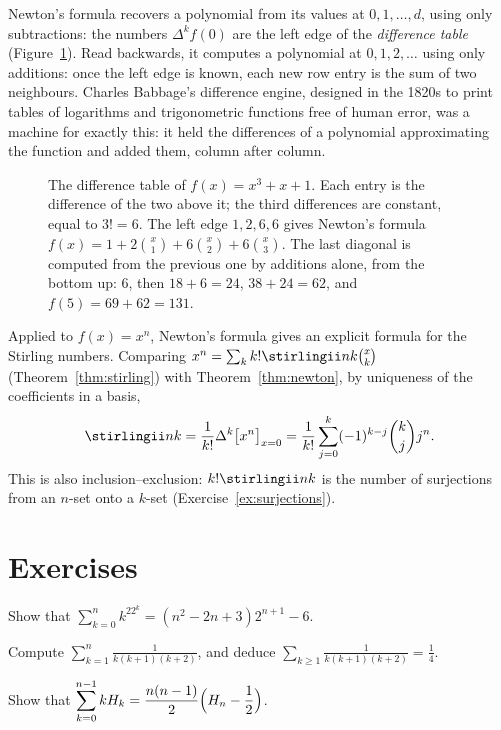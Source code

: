 Newton's formula recovers a polynomial from its values at $0,1,\dots,d$, using only subtractions: the numbers
$\Delta^kf(0)$ are the left edge of the \emph{difference table} (Figure~\ref{fig:difftable}). Read backwards, it computes
a polynomial at $0,1,2,\dots$ using only additions: once the left edge is known, each new row entry is the sum of
two neighbours. Charles Babbage's difference engine, designed in the 1820s to print tables of logarithms and
trigonometric functions free of human error, was a machine for exactly this: it held the differences of a polynomial
approximating the function and added them, column after column.

\begin{figure}[ht]
\centering
{}
\caption{The difference table of $f(x)=x^3+x+1$. Each entry is the difference of the two above it; the third
differences are constant, equal to $3!=6$. The left edge $1,2,6,6$ gives Newton's formula
$f(x)=1+2\binom x1+6\binom x2+6\binom x3$. The last diagonal is computed from the previous one by additions alone,
from the bottom up: $6$, then $18+6=24$, $38+24=62$, and $f(5)=69+62=131$.}
\label{fig:difftable}
\end{figure}

Applied to $f(x)=x^n$, Newton's formula gives an explicit formula for the Stirling numbers. Comparing
$x^n=\sum_kk!\stirlingii nk\binom xk$ (Theorem~\ref{thm:stirling}) with Theorem~\ref{thm:newton}, by uniqueness of the
coefficients in a basis,
\[
\stirlingii nk=\frac1{k!}\Delta^k\bigl[x^n\bigr]_{x=0}=\frac1{k!}\sum_{j=0}^k(-1)^{k-j}\binom kjj^n.
\]
This is also inclusion--exclusion: $k!\stirlingii nk$ is the number of surjections from an $n$-set onto a $k$-set
(Exercise~\ref{ex:surjections}).

\section{Exercises}

\begin{exercise}[$\star$]\label{ex:k22k}
Show that $\displaystyle\sum_{k=0}^nk^22^k=(n^2-2n+3)2^{n+1}-6$.
\end{exercise}

\begin{exercise}[$\star$]\label{ex:triple}
Compute $\displaystyle\sum_{k=1}^n\frac1{k(k+1)(k+2)}$, and deduce $\displaystyle\sum_{k\ge1}\frac1{k(k+1)(k+2)}=\frac14$.
\end{exercise}

\begin{exercise}[$\star\star$]\label{ex:kHk}
Show that $\displaystyle\sum_{k=0}^{n-1}kH_k=\frac{n(n-1)}2\Bigl(H_n-\frac12\Bigr)$.
\end{exercise}

